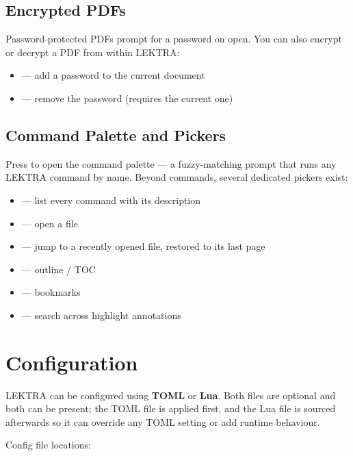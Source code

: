 \documentclass[a4paper,12pt]{article}
\begin{document}
\subsection{Encrypted PDFs}

Password-protected PDFs prompt for a password on open. You can also encrypt or decrypt a PDF from within LEKTRA:
\begin{itemize}[leftmargin=*]
    \item {} — add a password to the current document
    \item {} — remove the password (requires the current one)
\end{itemize}

\subsection{Command Palette and Pickers}

Press \keys{:} to open the command palette — a fuzzy-matching prompt that runs any LEKTRA command by name. Beyond commands, several dedicated pickers exist:
\begin{itemize}[leftmargin=*]
    \item {} — list every command with its description
    \item {} — open a file
    \item {} — jump to a recently opened file, restored to its last page
    \item {} — outline / TOC
    \item {} — bookmarks
    \item {} — search across highlight annotations
\end{itemize}

\section{Configuration}

LEKTRA can be configured using \textbf{TOML} or \textbf{Lua}. Both files are optional and both can be present; the TOML file is applied first, and the Lua file is sourced afterwards so it can override any TOML setting or add runtime behaviour.

Config file locations:
\end{document}
